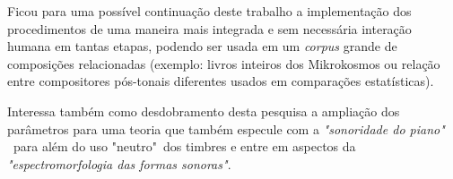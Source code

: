 \documentclass[
	12pt,				%
	openright,			%
	twoside,			%
	a4paper,			%
	english,			%
	french,				%
	spanish,			%
	brazil				%
	]{abntex2}
\begin{document}
Ficou para uma possível continuação deste trabalho a implementação dos procedimentos de uma maneira mais integrada e sem necessária interação humana em tantas etapas, podendo ser usada em um \textit{corpus} grande de composições relacionadas (exemplo: livros inteiros dos Mikrokosmos ou relação entre compositores pós-tonais diferentes usados em comparações estatísticas). 

Interessa também como desdobramento desta pesquisa a ampliação dos parâmetros para uma teoria que também especule com a \textit{"sonoridade do piano"} \cite{guigue2012}\ para além do uso "neutro"\ dos timbres e entre em aspectos da \textit{"espectromorfologia das formas sonoras"}. \cite{smalley1997spectromorphology}







\postextual

%

%
%

\end{document}
